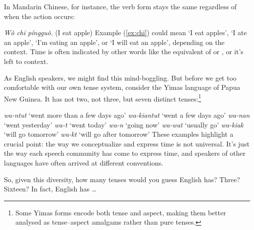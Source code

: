 In Mandarin Chinese, for instance, the verb form stays the same regardless of when the action occurs:

\ea \emph{Wǒ chī píngguǒ.} (I eat apple)\label{ex:chī}
\z
Example (\ref{ex:chī}) could mean `I eat apples', `I ate an apple', `I'm eating an apple', or `I will eat an apple', depending on the context. Time is often indicated by other words like the equivalent of  or , or it's left to context.

As English speakers, we might find this mind-boggling. But before we get too comfortable with our own tense system, consider the Yimas language of Papua New Guinea. It has not two, not three, but seven distinct tenses:\footnote{Some Yimas forms encode both tense and aspect, making them better analysed as tense--aspect amalgams rather than pure tenses.}

\ea
\ea \emph{wa-ntut} \hfill`went more than a few days ago'
\ex \emph{wa-kiantut} \hfill`went a few days ago'
\ex \emph{wa-nan} \hfill`went yesterday'
\ex \emph{wa-t} \hfill`went today'
\ex \emph{wa-n} \hfill`going now'
\ex \emph{wa-wat} \hfill`usually go'
\ex \emph{wa-kiak} \hfill`will go tomorrow'
\ex \emph{wa-kt} \hfill`will go after tomorrow'
\z\z
These examples highlight a crucial point: the way we conceptualize and express time is not universal. It's just the way each speech community has come to express time, and speakers of other languages have often arrived at different conventions.

So, given this diversity, how many tenses would you guess English has? Three? Sixteen? In fact, English has \dots

